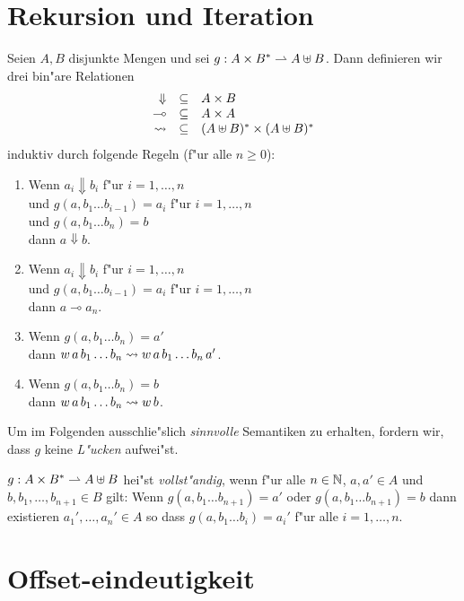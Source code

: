 \documentclass[12pt,a4paper]{article}
\begin{document}
\section{Rekursion und Iteration}

Seien $A,B$ disjunkte Mengen und sei $g: A \times B^* \rightharpoonup A \uplus B$. Dann definieren wir
drei bin"are Relationen
\[\begin{array}{rcl}
  \Downarrow & \subseteq & A \times B \\
  \multimap  & \subseteq & A \times A \\
  \rightsquigarrow      & \subseteq & (A \uplus B)^* \times (A \uplus B)^*
\end{array}\]
induktiv durch folgende Regeln (f"ur alle $n \ge 0$):
\begin{enumerate}
\item Wenn $a_i \Downarrow b_i$ f"ur $i=1,\ldots,n$ \\
  und $g(a,b_1 \ldots b_{i-1}) = a_i$ f"ur $i = 1,\ldots,n$ \\
  und $g(a,b_1 \ldots b_n) = b$ \\
  dann $a \Downarrow b$.
\item Wenn $a_i \Downarrow b_i$ f"ur $i=1,\ldots,n$ \\
  und $g(a,b_1 \ldots b_{i-1})=a_i$ f"ur $i=1,\ldots,n$ \\
  dann $a \multimap a_n$.
\item Wenn $g(a,b_1 \ldots b_n) = a'$ \\
  dann $w\,a\,b_1 \ldots b_n \rightsquigarrow w\,a\,b_1 \ldots b_n\,a'$.
\item Wenn $g(a,b_1 \ldots b_n) = b$ \\
  dann $w\,a\,b_1 \ldots b_n \rightsquigarrow w\,b$.
\end{enumerate}
Um im Folgenden ausschlie"slich \emph{sinnvolle} Semantiken zu erhalten, fordern wir, dass $g$
keine \emph{L"ucken} aufwei"st.
\begin{definition}
  $g: A \times B^* \rightharpoonup A \uplus B$ hei"st \emph{vollst"andig}, wenn f"ur alle $n \in \mathbb N$, $a,a'\in A$
  und $b,b_1,\ldots,b_{n+1} \in B$ gilt: 
  Wenn $g(a,b_1 \ldots b_{n+1}) = a'$ oder $g(a,b_1 \ldots b_{n+1}) = b$ dann
  existieren $a_1',\ldots,a_n' \in A$ so dass $g(a,b_1 \ldots b_i) = a_i'$ f"ur alle $i = 1,\ldots,n$.
\end{definition}


\section{Offset-eindeutigkeit}
\end{document}
